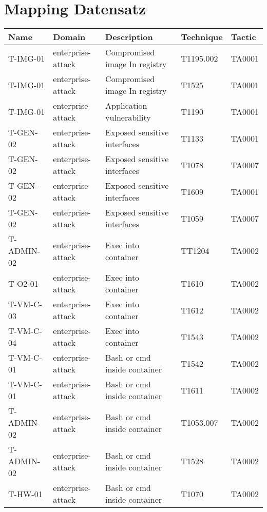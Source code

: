 \chapter{Mapping Datensatz}
\label{app:mapping-dataset}
\begin{table}[!ht]
    \caption{Mapping von Threat ID zu MITRE-Technik und MITRE-Taktik}
    \centering
    \begin{longtable}{|l|l|l|l|l|}
    \hline
        Name & Domain & Description & Technique & Tactic \\ \hline
        T-IMG-01 & enterprise-attack & Compromised image In registry & T1195.002 & TA0001 \\ \hline
        T-IMG-01 & enterprise-attack & Compromised image In registry & T1525 & TA0001 \\ \hline
        T-IMG-01 & enterprise-attack & Application vulnerability & T1190 & TA0001 \\ \hline
        T-GEN-02 & enterprise-attack & Exposed sensitive interfaces & T1133 & TA0001 \\ \hline
        T-GEN-02 & enterprise-attack & Exposed sensitive interfaces & T1078 & TA0007 \\ \hline
        T-GEN-02 & enterprise-attack & Exposed sensitive interfaces & T1609 & TA0001 \\ \hline
        T-GEN-02 & enterprise-attack & Exposed sensitive interfaces & T1059 & TA0007 \\ \hline
        T-ADMIN-02 & enterprise-attack & Exec into container & TT1204 & TA0002 \\ \hline
        T-O2-01 & enterprise-attack & Exec into container & T1610 & TA0002 \\ \hline
        T-VM-C-03 & enterprise-attack & Exec into container & T1612 & TA0002 \\ \hline
        T-VM-C-04 & enterprise-attack & Exec into container & T1543 & TA0002 \\ \hline
        T-VM-C-01 & enterprise-attack & Bash or cmd inside container & T1542 & TA0002 \\ \hline
        T-VM-C-01 & enterprise-attack & Bash or cmd inside container & T1611 & TA0002 \\ \hline
        T-ADMIN-02 & enterprise-attack & Bash or cmd inside container & T1053.007 & TA0002 \\ \hline
        T-ADMIN-02 & enterprise-attack & Bash or cmd inside container & T1528 & TA0002 \\ \hline
        T-HW-01 & enterprise-attack & Bash or cmd inside container & T1070 & TA0002 \\ \hline

\end{longtable}
\end{table}
